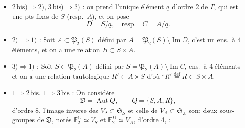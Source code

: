 \documentclass[11pt,a4paper]{article}
\begin{document}
\begin{itemize}
  \item[] $2\,\text{bis}) \Rightarrow 2)$, $3\,\text{bis}) \Rightarrow 3)$ :
    on prend l'unique élément $\underline{a}$ d'ordre 2 de $\Gamma$, qui est une
      pts fixes de $S$ (resp.\ $A$), et on
    pose
    \[
      D = S/\underline{a}, \quad \text{resp.} \quad C = A/\underline{a}.
    \]
  \item[] $2)$  $\Rightarrow 1)$ : Soit
    $A \subset \mathfrak{P}_2(S)$  défini par
    $A = \mathfrak{P}_2(S) \setminus \operatorname{Im} D$, c'est un ens.\ à
    4 éléments,  et on a une relation 
    $R \subset S \times A$.
  \item[] $3) \Rightarrow 1)$ : Soit $S \subset \mathfrak{P}_2(A)$ défini
    par $S = \mathfrak{P}_2(A) \setminus \operatorname{Im} C$, ens.\ à 4
    éléments et on a une relation tautologique $R' \subset A \times S$
    d'où ${}^{s}R' \overset{\mathrm{def}}{=} R \subset S \times A$.
  \item[] $1 \Rightarrow 2\,\text{bis}$, $1 \Rightarrow 3\,\text{bis}$ : On
    considère
    \[
      \mathfrak{D} = \operatorname{Aut} \underline{Q}, \qquad
      \underline{Q} = \{S, A, R\},
    \]
    d'ordre 8,  l'image inverse des
    $V_S \subset \mathfrak{S}_S$ et celle de $V_A \subset \mathfrak{S}_A$ sont
    deux sous-groupes \struck{\ill{}} de $\mathfrak{D}$, notés
    $\mathbb{F}_2^C \simeq V_S$ et $\mathbb{F}_2^D \simeq V_A$, \ill{}
    d'ordre 4, \struck{\ill{}} \ill{} \ill{} :
\end{itemize}




\end{document}
